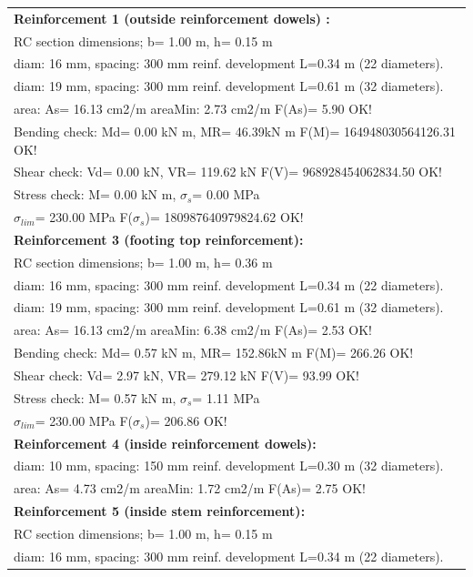 \begin{center}
\begin{supertabular}[H]{|l|}
\hline
\textbf{Reinforcement 1 (outside reinforcement dowels) :} \\
  RC section dimensions; b= 1.00 m, h= 0.15 m\\
  diam: 16 mm, spacing: 300 mm  reinf. development L=0.34 m (22 diameters).\\
  diam: 19 mm, spacing: 300 mm  reinf. development L=0.61 m (32 diameters).\\
  area: As=  16.13 cm2/m areaMin:   2.73 cm2/m  F(As)= 5.90 OK!\\
  Bending check: Md=   0.00 kN m, MR=  46.39kN m  F(M)= 164948030564126.31 OK!\\
  Shear check: Vd=   0.00 kN,  VR= 119.62 kN  F(V)= 968928454062834.50 OK!\\
  Stress check: M=   0.00 kN m, $\sigma_s$=   0.00 MPa\\
    $\sigma_{lim}$= 230.00 MPa  F($\sigma_s$)= 180987640979824.62 OK!\\
\textbf{Reinforcement 3 (footing top reinforcement):}\\
  RC section dimensions; b= 1.00 m, h= 0.36 m\\
  diam: 16 mm, spacing: 300 mm  reinf. development L=0.34 m (22 diameters).\\
  diam: 19 mm, spacing: 300 mm  reinf. development L=0.61 m (32 diameters).\\
  area: As=  16.13 cm2/m areaMin:   6.38 cm2/m  F(As)= 2.53 OK!\\
  Bending check: Md=   0.57 kN m, MR= 152.86kN m  F(M)= 266.26 OK!\\
  Shear check: Vd=   2.97 kN,  VR= 279.12 kN  F(V)= 93.99 OK!\\
  Stress check: M=   0.57 kN m, $\sigma_s$=   1.11 MPa\\
    $\sigma_{lim}$= 230.00 MPa  F($\sigma_s$)= 206.86 OK!\\
\textbf{Reinforcement 4 (inside reinforcement dowels):}\\
  diam: 10 mm, spacing: 150 mm  reinf. development L=0.30 m (32 diameters).\\
  area: As=   4.73 cm2/m areaMin:   1.72 cm2/m  F(As)= 2.75 OK!\\
\textbf{Reinforcement 5 (inside stem reinforcement):}\\
  RC section dimensions; b= 1.00 m, h= 0.15 m\\
  diam: 16 mm, spacing: 300 mm  reinf. development L=0.34 m (22 diameters).\\

\end{supertabular}
\end{center}
